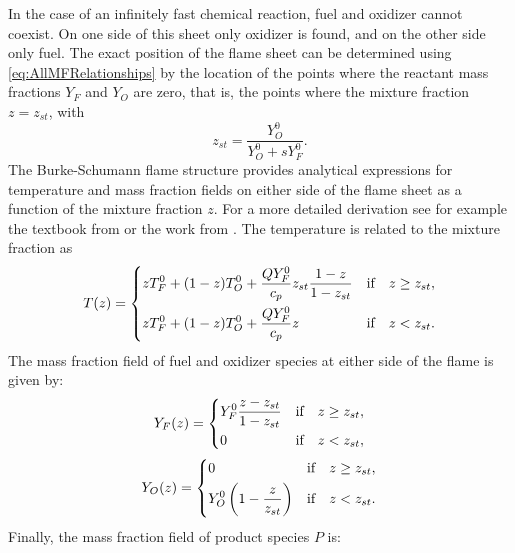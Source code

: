 In the case of an infinitely fast chemical reaction, fuel and oxidizer cannot coexist. On one side of this sheet only oxidizer is found, and on the other side only fuel. The exact position of the flame sheet can be determined  using \cref{eq:AllMFRelationships} by the location of the points where the reactant mass fractions $Y_F$ and $Y_O$ are zero, that is, the points where the mixture fraction $z = z_{st}$, with
\begin{equation}
	z_{st} = \frac{Y_O^0}{Y_O^0+sY_F^0}.
\end{equation}
The Burke-Schumann flame structure provides analytical expressions for temperature and mass fraction fields on either side of the flame sheet as a function of the mixture fraction $z$. For a more detailed derivation see for example the textbook from \textcite{poinsotTheoreticalNumericalCombustion2011} or the work from \textcite{keyesFlameSheetStarting1987}.
The temperature is related to the mixture fraction as
\begin{equation}\label{eq:BS-T}
	T(z) =
	\begin{dcases}
		z T_F^0 + (1-z)T_O^0 + \frac{Q Y_F^0}{c_p}z_{st}\frac{1 - z}{1-z_{st}} & \text{if}\quad z \geq z_{st}, \\
		z T_F^0 + (1-z)T_O^0 + \frac{Q Y_F^0}{c_p}z                            & \text{if}\quad z < z_{st}.
	\end{dcases}
\end{equation}
The mass fraction field of fuel and oxidizer species at either side of the flame is given by:
\begin{equation}\label{eq:BS-YF}
	Y_F(z) =
	\begin{dcases}
		Y_F^0\frac{z - z_{st}}{1-z_{st}} & \text{if}\quad z \geq z_{st}, \\
		0                                & \text{if} \quad z < z_{st},
	\end{dcases}
\end{equation}
\begin{equation}\label{eq:BS-YO}
	Y_O(z) =
	\begin{dcases}
		0                                         & \text{if} \quad z \geq z_{st}, \\
		Y_O^0 \left( 1- \frac{z}{z_{st}}  \right) & \text{if} \quad z < z_{st}.
	\end{dcases}
\end{equation}
Finally, the mass fraction field of product species $P$ is:
